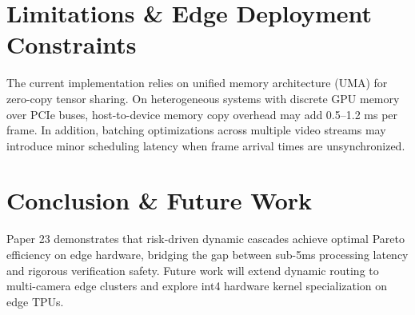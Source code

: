 \documentclass[conference]{IEEEtran}
\begin{document}
\section{Limitations & Edge Deployment Constraints}
The current implementation relies on unified memory architecture (UMA) for zero-copy tensor sharing. On heterogeneous systems with discrete GPU memory over PCIe buses, host-to-device memory copy overhead may add 0.5--1.2 ms per frame. In addition, batching optimizations across multiple video streams may introduce minor scheduling latency when frame arrival times are unsynchronized.

\section{Conclusion & Future Work}
Paper 23 demonstrates that risk-driven dynamic cascades achieve optimal Pareto efficiency on edge hardware, bridging the gap between sub-5ms processing latency and rigorous verification safety. Future work will extend dynamic routing to multi-camera edge clusters and explore int4 hardware kernel specialization on edge TPUs.
\end{document}

